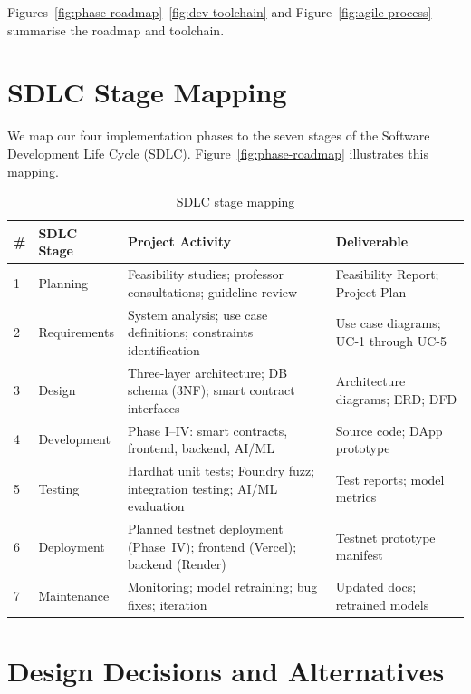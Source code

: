 \documentclass[12pt, a4paper]{report}
\newcommand{\tableheadcolor}{\rowcolor{TableHeadBg}}
\begin{document}
Figures~\ref{fig:phase-roadmap}--\ref{fig:dev-toolchain} and Figure~\ref{fig:agile-process} summarise the roadmap and toolchain.

\section{SDLC Stage Mapping}

We map our four implementation phases to the seven stages of the Software Development Life Cycle (SDLC). Figure~\ref{fig:phase-roadmap} illustrates this mapping.

\begin{table}[H]
\centering
\caption[SDLC stage mapping]{SDLC stage mapping}
\label{tab:sdlc-mapping}
\begin{tabular}{p{0.5cm}p{2.5cm}p{4.5cm}p{5cm}}
\toprule
\tableheadcolor
\textbf{\#} & \textbf{SDLC Stage} & \textbf{Project Activity} & \textbf{Deliverable} \\
\midrule
1 & Planning & Feasibility studies; professor consultations; guideline review & Feasibility Report; Project Plan \\
2 & Requirements & System analysis; use case definitions; constraints identification & Use case diagrams; UC-1 through UC-5 \\
3 & Design & Three-layer architecture; DB schema (3NF); smart contract interfaces & Architecture diagrams; ERD; DFD \\
4 & Development & Phase I--IV: smart contracts, frontend, backend, AI/ML & Source code; DApp prototype \\
5 & Testing & Hardhat unit tests; Foundry fuzz; integration testing; AI/ML evaluation & Test reports; model metrics \\
6 & Deployment & Planned testnet deployment (Phase~IV); frontend (Vercel); backend (Render) & Testnet prototype manifest \\
7 & Maintenance & Monitoring; model retraining; bug fixes; iteration & Updated docs; retrained models \\
\bottomrule
\end{tabular}
\end{table}

\vspace{2pt}

\section{Design Decisions and Alternatives}
\label{sec:design-decisions}
\end{document}
